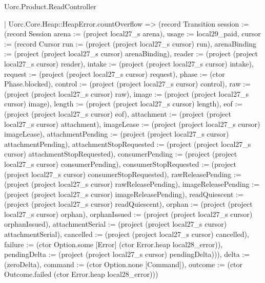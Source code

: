 \begin{lexlean}{Uorc.Product.ReadController}
\begin{semanticmodule}
{    | Uorc.Core.Heap::HeapError.countOverflow => (record Transition {session := (record Session {arena := (project local27_s arena), usage := local29_paid, cursor := (record Cursor {run := (project (project local27_s cursor) run), arenaBinding := (project (project local27_s cursor) arenaBinding), reader := (project (project local27_s cursor) reader), intake := (project (project local27_s cursor) intake), request := (project (project local27_s cursor) request), phase := (ctor Phase.blocked), control := (project (project local27_s cursor) control), raw := (project (project local27_s cursor) raw), image := (project (project local27_s cursor) image), length := (project (project local27_s cursor) length), eof := (project (project local27_s cursor) eof), attachment := (project (project local27_s cursor) attachment), imageLease := (project (project local27_s cursor) imageLease), attachmentPending := (project (project local27_s cursor) attachmentPending), attachmentStopRequested := (project (project local27_s cursor) attachmentStopRequested), consumerPending := (project (project local27_s cursor) consumerPending), consumerStopRequested := (project (project local27_s cursor) consumerStopRequested), rawReleasePending := (project (project local27_s cursor) rawReleasePending), imageReleasePending := (project (project local27_s cursor) imageReleasePending), readQuiescent := (project (project local27_s cursor) readQuiescent), orphan := (project (project local27_s cursor) orphan), orphanIssued := (project (project local27_s cursor) orphanIssued), attachmentSerial := (project (project local27_s cursor) attachmentSerial), cancelled := (project (project local27_s cursor) cancelled), failure := (ctor Option.some [Error] (ctor Error.heap local28_error)), pendingDelta := (project (project local27_s cursor) pendingDelta)})}), delta := (zeroDelta), command := (ctor Option.none [Command]), outcome := (ctor Outcome.failed (ctor Error.heap local28_error))})
}
\end{semanticmodule}
\end{lexlean}
